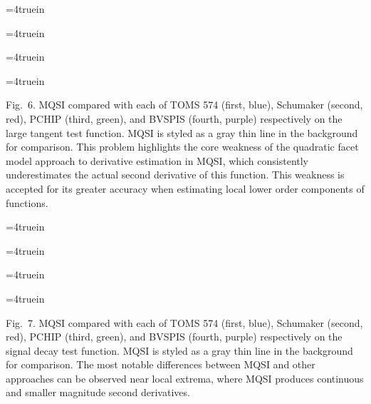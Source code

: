 \topinsert
\centerline{\epsfxsize=4truein }
\centerline{\epsfxsize=4truein }
\centerline{\epsfxsize=4truein }
\centerline{\epsfxsize=4truein }
{\narrower\noindent\rmVIII Fig.\ 6.
{\ttVIII MQSI} compared with each of TOMS 574 (first, blue), Schumaker
(second, red), {\ttVIII PCHIP} (third, green), and {\ttVIII BVSPIS}
(fourth, purple) respectively on the {\itVIII large tangent} test
function. {\ttVIII MQSI} is styled as a gray thin line in the
background for comparison. This problem highlights the core weakness
of the quadratic facet model approach to derivative estimation in
{\ttVIII MQSI}, which consistently underestimates the actual
second derivative of this function. This weakness is accepted
for its greater accuracy when estimating local lower order components
of functions.
\par}
\endinsert

\topinsert
\centerline{\epsfxsize=4truein }
\centerline{\epsfxsize=4truein }
\centerline{\epsfxsize=4truein }
\centerline{\epsfxsize=4truein }
{\narrower\noindent\rmVIII Fig.\ 7.
{\ttVIII MQSI} compared with each of TOMS 574 (first, blue), Schumaker
(second, red), {\ttVIII PCHIP} (third, green), and {\ttVIII BVSPIS}
(fourth, purple) respectively on the {\itVIII signal decay} test
function. {\ttVIII MQSI} is styled as a gray thin line in the
background for comparison. The most notable differences between
{\ttVIII MQSI} and other approaches can be observed near local
extrema, where {\ttVIII MQSI} produces continuous and smaller
magnitude second derivatives.
\par}
\endinsert

